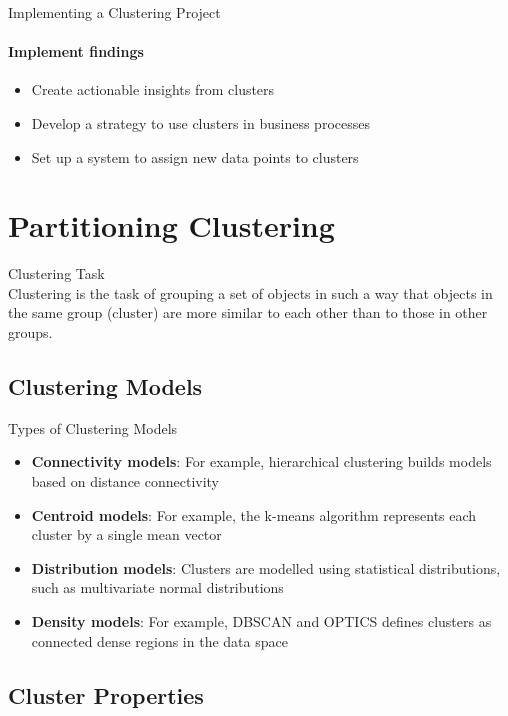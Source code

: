 \begin{KR}{Implementing a Clustering Project}
\paragraph{Implement findings}
\begin{itemize}
    \item Create actionable insights from clusters
    \item Develop a strategy to use clusters in business processes
    \item Set up a system to assign new data points to clusters
\end{itemize}
\end{KR}

\section{Partitioning Clustering}

\begin{definition}{Clustering Task}\\
Clustering is the task of grouping a set of objects in such a way that objects in the same group (cluster) are more similar to each other than to those in other groups.
\end{definition}

\subsection{Clustering Models}

\begin{concept}{Types of Clustering Models}
\begin{itemize}
    \item \textbf{Connectivity models}: For example, hierarchical clustering builds models based on distance connectivity
    \item \textbf{Centroid models}: For example, the k-means algorithm represents each cluster by a single mean vector
    \item \textbf{Distribution models}: Clusters are modelled using statistical distributions, such as multivariate normal distributions
    \item \textbf{Density models}: For example, DBSCAN and OPTICS defines clusters as connected dense regions in the data space
\end{itemize}
\end{concept}

\subsection{Cluster Properties}

